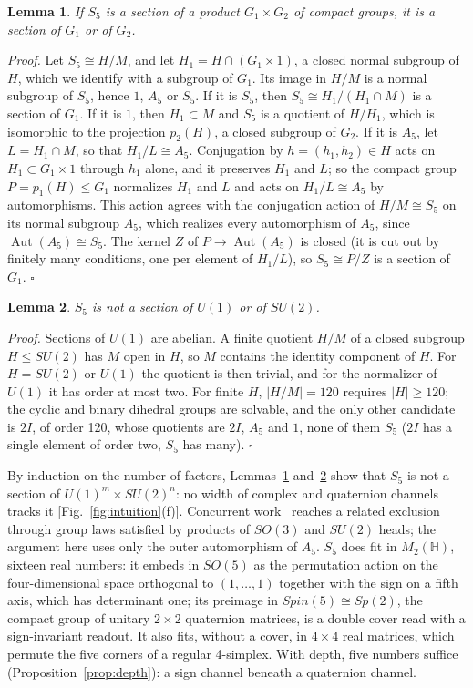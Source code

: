 \documentclass[aps,prx,reprint,superscriptaddress,longbibliography,nofootinbib,floatfix]{revtex4-2}
\newcommand{\HH}{\mathbb{H}}
\theoremstyle{plain}
\newtheorem{lemma}{Lemma}
\theoremstyle{definition}
\begin{document}
\begin{lemma}\label{lem:s5section}
If $S_5$ is a section of a product $G_1\times G_2$ of compact groups, it is
a section of $G_1$ or of $G_2$.
\end{lemma}
\emph{Proof.} Let $S_5\cong H/M$, and let $H_1=H\cap(G_1\times1)$, a closed
normal subgroup of $H$, which we identify with a subgroup of $G_1$. Its
image in $H/M$ is a normal subgroup of $S_5$, hence $1$, $A_5$ or $S_5$.
If it is $S_5$, then $S_5\cong H_1/(H_1\cap M)$ is a section of $G_1$. If it
is $1$, then $H_1\subset M$ and $S_5$ is a quotient of $H/H_1$, which is
isomorphic to the projection $p_2(H)$, a closed subgroup of $G_2$. If it is
$A_5$, let $L=H_1\cap M$, so that $H_1/L\cong A_5$. Conjugation by
$h=(h_1,h_2)\in H$ acts on $H_1\subset G_1\times1$ through $h_1$ alone, and
it preserves $H_1$ and $L$; so the compact group $P=p_1(H)\le G_1$
normalizes $H_1$ and $L$ and acts on $H_1/L\cong A_5$ by automorphisms. This
action agrees with the conjugation action of $H/M\cong S_5$ on its normal
subgroup $A_5$, which realizes every automorphism of $A_5$, since
$\operatorname{Aut}(A_5)\cong S_5$. The kernel $Z$ of $P\to\operatorname{Aut}(A_5)$
is closed (it is cut out by finitely many conditions, one per element of
$H_1/L$), so $S_5\cong P/Z$ is a section of $G_1$. $\square$

\begin{lemma}\label{lem:su2}
$S_5$ is not a section of $U(1)$ or of $SU(2)$.
\end{lemma}
\emph{Proof.} Sections of $U(1)$ are abelian. A finite quotient $H/M$ of a
closed subgroup $H\le SU(2)$ has $M$ open in $H$, so $M$ contains the
identity component of $H$. For $H=SU(2)$ or $U(1)$ the quotient is then
trivial, and for the normalizer of $U(1)$ it has order at most two. For
finite $H$, $|H/M|=120$ requires $|H|\ge120$; the cyclic and binary dihedral
groups are solvable, and the only other candidate is $2I$, of order 120,
whose quotients are $2I$, $A_5$ and $1$, none of them $S_5$ ($2I$ has a
single element of order two, $S_5$ has many). $\square$

By induction on the number of factors, Lemmas~\ref{lem:s5section}
and~\ref{lem:su2} show that $S_5$ is not a section of
$U(1)^m\times SU(2)^n$: no width of complex and quaternion channels
tracks it [Fig.~\ref{fig:intuition}(f)]. Concurrent work~\cite{jia_ncssm} reaches a
related exclusion through group laws satisfied by products of $SO(3)$ and
$SU(2)$ heads; the argument here uses only the outer automorphism of $A_5$. $S_5$ does fit in $M_2(\HH)$,
sixteen real numbers: it embeds in $SO(5)$ as the permutation action on the
four-dimensional space orthogonal to $(1,\dots,1)$ together with the sign
on a fifth axis, which has determinant one; its preimage in
$Spin(5)\cong Sp(2)$, the compact group of unitary $2\times2$ quaternion
matrices, is a double cover read
with a sign-invariant readout. It also fits, without a cover, in $4\times4$
real matrices, which permute the five corners of a regular 4-simplex. With
depth, five numbers suffice (Proposition~\ref{prop:depth}): a sign channel
beneath a quaternion channel.
\end{document}
